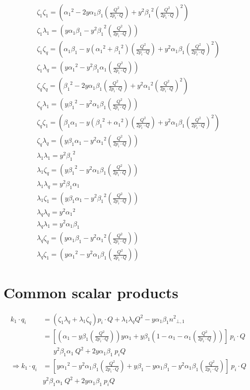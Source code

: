 \begin{equation}
	\begin{aligned}
	\zeta_1\zeta_1=({\alpha_1}^2 -2y\alpha_1 \beta_1(\frac{Q^2}{2p_i \cdot Q})+y^2{\beta_1}^2(\frac{Q^2}{2p_i \cdot Q})^2)\\
	\zeta_1\lambda_1=(y\alpha_1\beta_1 -{y^2\beta_1}^2(\frac{Q^2}{2p_i \cdot Q}))\\
	\zeta_1\zeta_q=(\alpha_1\beta_1-y({\alpha_1}^2+{\beta_1}^2) (\frac{Q^2}{2p_i \cdot Q})+y^2{\alpha_1}{\beta_1}(\frac{Q^2}{2p_i \cdot Q})^2)\\
	\zeta_1\lambda_q=(y{\alpha_1}^2 -y^2\beta_1\alpha_1(\frac{Q^2}{2p_i \cdot Q}))\\
	\zeta_q\zeta_q=	({\beta_1}^2 -2y\alpha_1\beta_1 (\frac{Q^2}{2p_i \cdot Q})+ y^2{\alpha_1}^2 (\frac{Q^2}{2p_i \cdot Q})^2) \\
	\zeta_q\lambda_1=(y{\beta_1}^2 -y^2\alpha_1 \beta_1(\frac{Q^2}{2p_i \cdot Q}))\\
	\zeta_q\zeta_1=(\beta_1\alpha_1-y({\beta_1}^2+{\alpha_1}^2)(\frac{Q^2}{2p_i \cdot Q})+y^2\alpha_1\beta_1 (\frac{Q^2}{2p_i \cdot Q})^2)\\
	\zeta_q\lambda_q=(y\beta_1\alpha_1 -y^2{\alpha_1}^2(\frac{Q^2}{2p_i \cdot Q}))\\
	\lambda_1\lambda_1=y^2{\beta_1}^2\\
	\lambda_1\zeta_q=(y{\beta_1}^2 -y^2\alpha_1 \beta_1(\frac{Q^2}{2p_i \cdot Q}))\\
	\lambda_1\lambda_q=y^2\beta_1\alpha_1\\
	\lambda_1\zeta_1=(y\beta_1\alpha_1 -y^2{\beta_1}^2(\frac{Q^2}{2p_i \cdot Q}))\\
	\lambda_q\lambda_q=y^2{\alpha_1}^2\\
	\lambda_q\lambda_1=y^2\alpha_1\beta_1\\
	\lambda_q\zeta_q=(y\alpha_1\beta_1 -y^2{\alpha_1}^2 (\frac{Q^2}{2p_i \cdot Q}))\\
	\lambda_q\zeta_1=(y{\alpha_1}^2 -y^2\alpha_1\beta_1(\frac{Q^2}{2p_i \cdot Q}))
    \end{aligned}
\end{equation}
\section{Common scalar products}
\begin{equation}
	\begin{aligned}	
k_1 \cdot q_i &= (\zeta_1 \lambda_q + \lambda_1 \zeta_q)p_i \cdot Q+\lambda_1 \lambda_q Q^2 -y\alpha_1\beta_1 {n^{2}}_{\bot,1}\\
	&=[(\alpha_1 -y\beta_1(\frac{Q^2}{2p_i \cdot Q}))y\alpha_1+y\beta_1(1- \alpha_1 -\alpha_1 (\frac{Q^2}{2p_i \cdot Q}))]\:p_i \cdot Q\\
	&\:\:\:\:\:\:\:y^2\beta_1\alpha_1\: Q^2+2y\alpha_1\beta_1\:p_iQ\\
\Rightarrow	k_1 \cdot q_i &=[y{\alpha_1}^2 -y^2\alpha_1\beta_1(\frac{Q^2}{2p_i \cdot Q})+y\beta_1- y\alpha_1\beta_1-y^2\alpha_1\beta_1(\frac{Q^2}{2p_i \cdot Q})]\:p_i\cdot Q\\
	&y^2\beta_1\alpha_1\: Q^2+2y\alpha_1\beta_1\:p_iQ\\	
    \end{aligned}
\end{equation}

